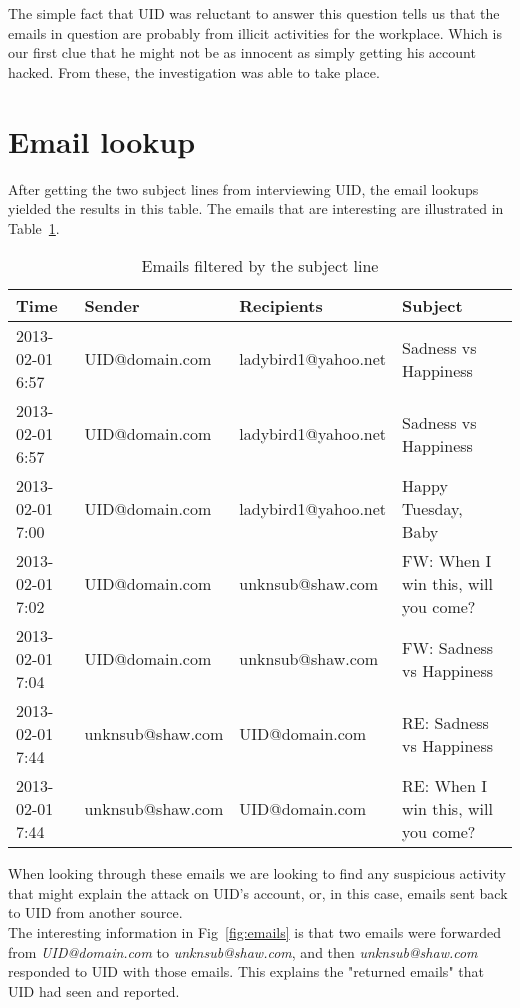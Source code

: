 \documentclass{article}
\numberwithin{equation}{section} %
\numberwithin{figure}{section} %
\numberwithin{table}{section} %
\begin{document}
The simple fact that UID was reluctant to answer this question tells us that the emails in question are probably from illicit activities for the workplace.  Which is our first clue that he might not be as innocent as simply getting his account hacked.  From these, the investigation was able to take place.

\section{Email lookup}
After getting the two subject lines from interviewing UID, the email lookups yielded the results in this table.\cite{emails}  The emails that are interesting are illustrated in Table~\ref{tab:emails}.

\begin{center}
	\begin{table}[h]
	\label{tab:emails}
	\begin{tabular}{| l | l | l | l |}
		\hline
		Time &	Sender &	Recipients &		Subject \\
		\hline
		2013-02-01 6:57 & UID@domain.com & ladybird1@yahoo.net & Sadness vs Happiness \\
		2013-02-01 6:57 & UID@domain.com & ladybird1@yahoo.net & Sadness vs Happiness \\
		2013-02-01 7:00 & UID@domain.com & ladybird1@yahoo.net & Happy Tuesday, Baby \\
		2013-02-01 7:02 & UID@domain.com & unknsub@shaw.com & FW: When I win this, will you come? \\
		2013-02-01 7:04 & UID@domain.com & unknsub@shaw.com & FW: Sadness vs Happiness \\
		2013-02-01 7:44 & unknsub@shaw.com & UID@domain.com & RE: Sadness vs Happiness \\
		2013-02-01 7:44 & unknsub@shaw.com & UID@domain.com & RE: When I win this, will you come?\\
		\hline
	\end{tabular}
	\caption{Emails filtered by the subject line}		
	\end{table}	
\end{center}

When looking through these emails we are looking to find any suspicious activity that might explain the attack on UID's account, or, in this case, emails sent back to UID from another source. \\

The interesting information in Fig~\ref{fig:emails} is that two emails were forwarded from \textit{UID@domain.com} to \textit{unknsub@shaw.com}, and then \textit{unknsub@shaw.com} responded to UID with those emails.  This explains the "returned emails" that UID had seen and reported.  
\end{document}
